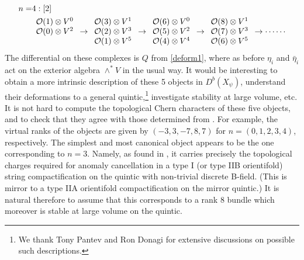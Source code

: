 \begin{equation}
\begin{split}
n=&4:[2]\\&
\begin{array}{c}
\calo(1)\otimes V^0 \\
\calo(0)\otimes V^2\\
\phantom{\calo}
\end{array}
\to
\begin{array}{c}
\calo(3)\otimes V^1\\
\calo(2)\otimes V^3 \\
\calo(1)\otimes V^5 
\end{array}
\to
\begin{array}{c}
\calo(6)\otimes V^0\\
\calo(5)\otimes V^2\\
\calo(4)\otimes V^4\\
\end{array}
\to
\begin{array}{c}
\calo(8)\otimes V^1\\
\calo(7)\otimes V^3 \\
\calo(6)\otimes V^5 
\end{array}
\to
\cdots\cdots 
\end{split}
\end{equation}
The differential on these complexes is $Q$ from \eqref{deform1}, where
as before $\eta_i$ and $\bar\eta_i$ act on the exterior algebra $\wedge^* V$ in
the usual way. It would be interesting to obtain a more intrinsic description
of these 5 objects in $D^b(X_\psi)$, understand their deformations to a general
quintic,\footnote{We thank Tony Pantev and Ron Donagi for
extensive discussions on possible such descriptions.} investigate stability
at large volume, etc. It is not hard to compute the topological Chern characters 
of these five objects, and to check that they agree with those determined from 
\cite{bdlr}. For example, the virtual ranks of the objects are given by 
$(-3,3,-7,8,7)$ for $n=(0,1,2,3,4)$, respectively. The simplest and most 
canonical object appears to be the one corresponding to $n=3$. Namely, as 
found in \cite{bhhw}, it carries precisely the topological charges
required for anomaly cancellation in a type I (or type IIB orientifold) string
compactification on the quintic with non-trivial discrete B-field. (This is
mirror to a type IIA orientifold compactification on the mirror quintic.) It
is natural therefore to assume that this corresponds to a rank $8$ bundle
which moreover is stable at large volume on the quintic.


